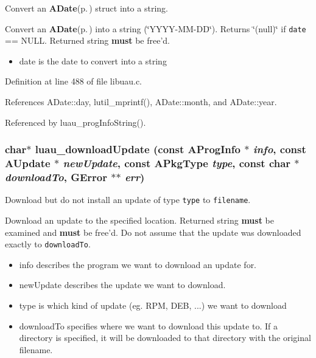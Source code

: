 Convert an {\bf ADate}{\rm (p.\,\pageref{structADate})} struct into a string. 

Convert an {\bf ADate}{\rm (p.\,\pageref{structADate})} into a string (\char`\"{}YYYY-MM-DD\char`\"{}). Returns \char`\"{}(null)\char`\"{} if {\tt date} == NULL. Returned string {\bf must} be free'd.

\begin{itemize}
\item date is the date to convert into a string 
\end{itemize}


Definition at line 488 of file libuau.c.

References ADate::day, lutil\_\-mprintf(), ADate::month, and ADate::year.

Referenced by luau\_\-prog\-Info\-String().
\subsubsection{\setlength{\rightskip}{0pt plus 5cm}char$\ast$ luau\_\-download\-Update (const {\bf AProg\-Info} $\ast$ {\em info}, const {\bf AUpdate} $\ast$ {\em new\-Update}, const {\bf APkg\-Type} {\em type}, const char $\ast$ {\em download\-To}, GError $\ast$$\ast$ {\em err})}\label{libuau_8h_a56}


Download but do not install an update of type {\tt type} to {\tt filename}. 

Download an update to the specified location. Returned string {\bf must} be examined and {\bf must} be free'd. Do not assume that the update was downloaded exactly to {\tt download\-To}.

\begin{itemize}
\item info describes the program we want to download an update for. \item new\-Update describes the update we want to download. \item type is which kind of update (eg. RPM, DEB, ...) we want to download \item download\-To specifies where we want to download this update to. If a directory is specified, it will be downloaded to that directory with the original filename. 
\end{itemize}


